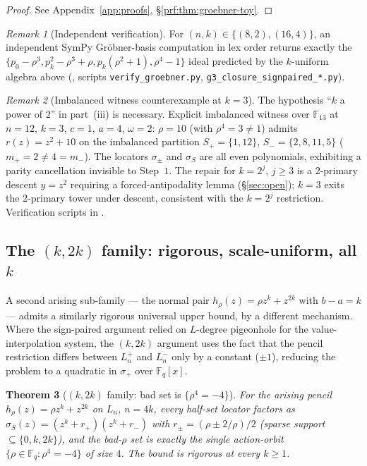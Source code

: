 \documentclass[11pt]{article}
\newtheorem{theorem}{Theorem}[section]
\theoremstyle{definition}
\theoremstyle{remark}
\newtheorem{remark}[theorem]{Remark}
\newcommand{\FF}{\mathbb{F}}
\begin{document}
\begin{proof}[Proof] See Appendix~\ref{app:proofs}, \S\ref{prf:thm:groebner-toy}.\end{proof}

\begin{remark}[Independent verification]
\label{rem:independent-gb}
For $(n, k) \in \{(8, 2), (16, 4)\}$, an independent SymPy
Gr\"obner-basis computation in lex order returns exactly the
$\{p_0 - \rho^3, p_k^2 - \rho^3 + \rho, p_k(\rho^2 + 1), \rho^4 - 1\}$
ideal predicted by the $k$-uniform algebra above
(\cite{CompanionRepo}, scripts \texttt{verify\_groebner.py},
\texttt{g3\_closure\_signpaired\_*.py}).
\end{remark}

\begin{remark}[Imbalanced witness counterexample at $k = 3$]
\label{rem:signpaired-k3-counterexample}
The hypothesis ``$k$ a power of $2$'' in part~(iii) is necessary.
Explicit imbalanced witness over $\FF_{13}$ at $n = 12$, $k = 3$,
$c = 1$, $a = 4$, $\omega = 2$: $\rho = 10$ (with
$\rho^4 = 3 \neq 1$) admits $r(z) = z^2 + 10$ on the imbalanced
partition $S_+ = \{1, 12\}$, $S_- = \{2, 8, 11, 5\}$ ($m_+ = 2 \neq
4 = m_-$). The locators $\sigma_\pm$ and $\sigma_S$ are all even
polynomials, exhibiting a parity cancellation invisible to Step~$1$.
The repair for $k = 2^j$, $j \geq 3$ is a $2$-primary descent
$y = z^2$ requiring a forced-antipodality lemma (\S\ref{sec:open});
$k = 3$ exits the $2$-primary tower
under descent, consistent with the $k = 2^j$ restriction. Verification
scripts in \cite{CompanionRepo}.
\end{remark}

\subsection{The $(k, 2k)$ family: rigorous, scale-uniform, all $k$}
\label{ssec:k2k-universal}

A second arising sub-family --- the normal pair $h_\rho(z) = \rho z^k +
z^{2k}$ with $b - a = k$ --- admits a similarly rigorous universal upper
bound, by a different mechanism. Where the sign-paired argument relied
on $L$-degree pigeonhole for the value-interpolation system, the
$(k, 2k)$ argument uses the fact that the pencil restriction differs
between $L_n^+$ and $L_n^-$ only by a constant ($\pm 1$), reducing the
problem to a quadratic in $\sigma_+$ over $\FF_q[x]$.

\begin{theorem}[$(k, 2k)$ family: bad set is $\{\rho^4 = -4\}$]
\label{thm:k2k-universal}
For the arising pencil $h_\rho(z) = \rho z^k + z^{2k}$ on $L_n$,
$n = 4k$, every half-set locator factors as
$\sigma_S(z) = (z^k + r_+)(z^k + r_-)$ with
$r_\pm = (\rho \pm 2/\rho)/2$ (sparse support
$\subseteq \{0, k, 2k\}$), and the bad-$\rho$ set is exactly the
single action-orbit $\{\rho \in \FF_q : \rho^4 = -4\}$ of size $4$.
The bound is rigorous at every $k \geq 1$.
\end{theorem}
\end{document}

